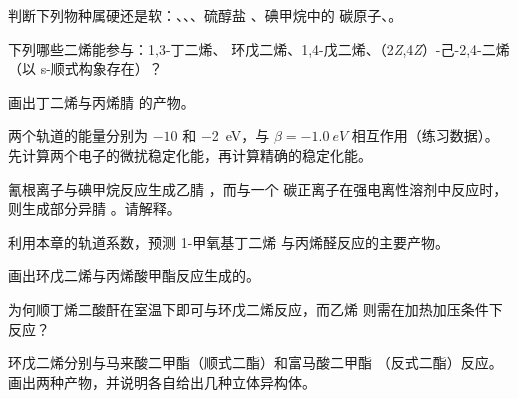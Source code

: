 \begin{exercise}[$\star$]\label{exo:b2:frontier-orbitals:2}
判断下列物种属硬还是软：、、、硫醇盐 、碘甲烷中的
碳原子、。
\end{exercise}

\begin{exercise}[$\star$]\label{exo:b2:frontier-orbitals:3}
下列哪些二烯能参与：1,3-丁二烯、
环戊二烯、1,4-戊二烯、（2\textit{Z},4\textit{Z}）-己-2,4-二烯
（以 s-顺式构象存在）？
\end{exercise}

\begin{exercise}[$\star$]\label{exo:b2:frontier-orbitals:4}
画出丁二烯与丙烯腈  的产物。
\end{exercise}

\begin{exercise}[$\star\star$]\label{exo:b2:frontier-orbitals:5}
两个轨道的能量分别为 $-10$ 和 \qty{-2}{eV}，与 $\beta = \qty{-1.0}{eV}$ 相互作用（练习数据）。
先计算两个电子的微扰稳定化能，再计算精确的稳定化能。
\end{exercise}

\begin{exercise}[$\star\star$]\label{exo:b2:frontier-orbitals:6}
氰根离子与碘甲烷反应生成乙腈 ，而与一个
碳正离子在强电离性溶剂中反应时，则生成部分异腈 。请解释。
\end{exercise}

\begin{exercise}[$\star\star$]\label{exo:b2:frontier-orbitals:7}
利用本章的轨道系数，预测 1-甲氧基丁二烯
与丙烯醛反应的主要产物。
\end{exercise}

\begin{exercise}[$\star\star$]\label{exo:b2:frontier-orbitals:8}
画出环戊二烯与丙烯酸甲酯反应生成的。
\end{exercise}

\begin{exercise}[$\star\star$]\label{exo:b2:frontier-orbitals:9}
为何顺丁烯二酸酐在室温下即可与环戊二烯反应，而乙烯
则需在加热加压条件下反应？
\end{exercise}

\begin{exercise}[$\star\star\star$]\label{exo:b2:frontier-orbitals:10}
环戊二烯分别与马来酸二甲酯（顺式二酯）和富马酸二甲酯
（反式二酯）反应。画出两种产物，并说明各自给出几种立体异构体。
\end{exercise}

